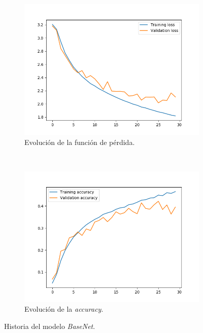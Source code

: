 \documentclass[11pt,a4paper]{article}
\begin{document}
\begin{figure}[H]
  \centering
  \begin{subfigure}[t]{0.5\textwidth}
    \centering
    \includegraphics[scale=0.42]{img/base-model-loss.png}
    \caption{Evolución de la función de pérdida.}
    \label{fig:base-model-loss}
  \end{subfigure}%
  ~ \quad
  \begin{subfigure}[t]{0.5\textwidth}
    \centering
    \includegraphics[scale=0.42]{img/base-model-acc.png}
    \caption{Evolución de la \textit{accuracy}.}
    \label{fig:base-model-acc}
  \end{subfigure}
  \caption{Historia del modelo \textit{BaseNet}.}
  \label{fig:basenet-history}
\end{figure}
\end{document}
